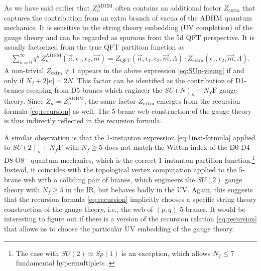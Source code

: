 \documentclass[letterpaper, 11pt]{article}
\def\e{\epsilon}
\begin{document}
{As we have said earlier that $Z_n^\text{ADHM}$ often contains an additional factor $Z_\text{extra}$ that captures the contribution from an extra branch of vacua of the ADHM quantum mechanics. It is sensitive to the string theory embedding (UV completion) of the gauge theory and can be regarded as spurious from the 5d QFT perspective. It is usually factorized from the true QFT partition function as 
\begin{align}
  \sum_{n=0}^\infty q^n \,Z_n^\text{ADHM}(\vec{a}, \e_{1},\e_2, \vec{m}) = Z_\text{QFT}(\vec{a}, \e_{1},\e_2, \vec{m},\Lambda) \cdot Z_\text{extra}(\e_{1},\e_2,  \vec{m},\Lambda).
\end{align}
A non-trivial $Z_\text{extra}\neq 1$ appears in the above expression \eqref{eq:SUn-young} if and only if $N_f + 2|\kappa| = 2N$. This factor can be identified as the contribution of D1-branes escaping from D5-branes which engineer the $SU(N)_\kappa + N_f\mathbf{F}$ gauge theory. Since $Z_n = Z_n^\text{ADHM}$, the same factor $Z_\text{extra}$ emerges from the recursion formula \eqref{eq:recursion} as well. The 5-brane web construction of the gauge theory is thus indirectly reflected in the recursion formula. 

A similar observation is that the 1-instanton expression \eqref{eq:1inst-formula} applied to $SU(2)_\kappa+N_f\mathbf{F}$ with $N_f \geq 5$ does not match the Witten index of the D0-D4-D8-O8${}^-$  quantum mechanics, which is the correct 1-instanton partition function.\footnote{The case with $SU(2) \simeq Sp(1
)$ is an exception, which allows $N_f \leq 7$ fundamental hypermultiplets \cite{Seiberg:1996bd}.} Instead, it coincides with the topological vertex computation applied to the 5-brane web with a colliding pair of branes, which engineers the $SU(2)$ gauge theory with $N_f \geq 5$ in the IR, but behaves badly in the UV. Again, this suggests that the recursion formula \eqref{eq:recursion} implicitly chooses a specific string theory construction of the gauge theory, i.e., the web of $(p,q)$ 5-branes. It would be interesting to figure out if there is a version of the recursion relation \eqref{eq:recursion} that allows us to choose the particular UV embedding of the gauge theory. 


}
\end{document}
